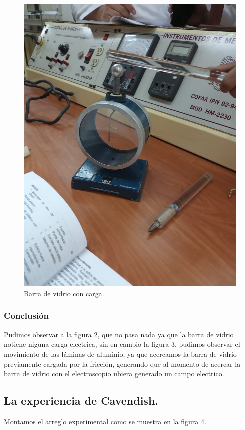 \documentclass[10pt]{article}
\begin{document}
\begin{multicols}{2}
\begin{figure}[h]
\includegraphics[scale=0.07]{p3}
\caption{Barra de vidrio con carga.}
\end{figure}

\subsubsection*{Conclusión}
Pudimos observar a la figura 2, que no pasa nada ya que la barra de vidrio notiene niguna carga electrica, sin en cambio la figura 3, pudimos observar el movimiento de las láminas de aluminio, ya que acercamos la barra de vidrio previamente cargada por la fricción, generando que al momento de acercar la barra de vidrio con el electroscopio ubiera generado un campo electrico.
\subsection{La experiencia de Cavendish.}
Montamos el arreglo experimental como se muestra en la figura 4.


\end{multicols}
\end{document}
